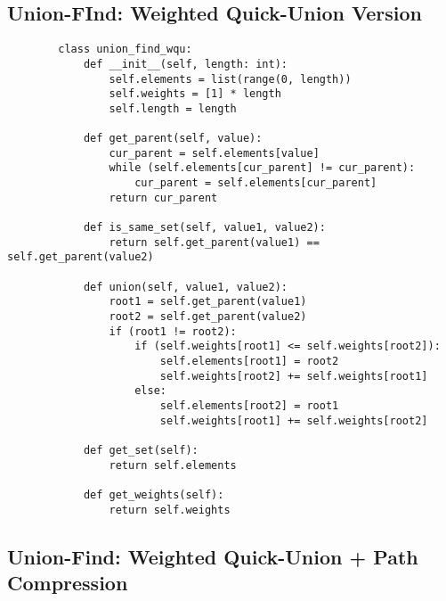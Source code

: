     \newpage





\subsection{ Union-FInd: Weighted Quick-Union Version }

    \begin{lstlisting}
        class union_find_wqu:
            def __init__(self, length: int):
                self.elements = list(range(0, length))
                self.weights = [1] * length
                self.length = length
     
            def get_parent(self, value):
                cur_parent = self.elements[value]
                while (self.elements[cur_parent] != cur_parent):
                    cur_parent = self.elements[cur_parent]
                return cur_parent

            def is_same_set(self, value1, value2):
                return self.get_parent(value1) == self.get_parent(value2)
            
            def union(self, value1, value2):
                root1 = self.get_parent(value1)
                root2 = self.get_parent(value2)
                if (root1 != root2):
                    if (self.weights[root1] <= self.weights[root2]):
                        self.elements[root1] = root2
                        self.weights[root2] += self.weights[root1]
                    else:
                        self.elements[root2] = root1
                        self.weights[root1] += self.weights[root2]

            def get_set(self):
                return self.elements
            
            def get_weights(self):
                return self.weights
    \end{lstlisting}

    \newpage





\subsection{ Union-Find: Weighted Quick-Union + Path Compression }

